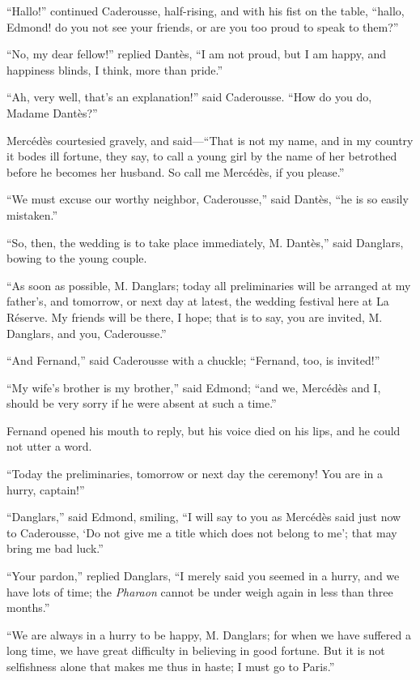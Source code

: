 “Hallo!” continued Caderousse, half-rising, and with his fist on the
table, “hallo, Edmond! do you not see your friends, or are you too
proud to speak to them?”

“No, my dear fellow!” replied Dantès, “I am not proud, but I am happy,
and happiness blinds, I think, more than pride.”

“Ah, very well, that’s an explanation!” said Caderousse. “How do you
do, Madame Dantès?”

Mercédès courtesied gravely, and said—“That is not my name, and in my
country it bodes ill fortune, they say, to call a young girl by the
name of her betrothed before he becomes her husband. So call me
Mercédès, if you please.”

“We must excuse our worthy neighbor, Caderousse,” said Dantès, “he is
so easily mistaken.”

“So, then, the wedding is to take place immediately, M. Dantès,” said
Danglars, bowing to the young couple.

“As soon as possible, M. Danglars; today all preliminaries will be
arranged at my father’s, and tomorrow, or next day at latest, the
wedding festival here at La Réserve. My friends will be there, I hope;
that is to say, you are invited, M. Danglars, and you, Caderousse.”

“And Fernand,” said Caderousse with a chuckle; “Fernand, too, is
invited!”

“My wife’s brother is my brother,” said Edmond; “and we, Mercédès and
I, should be very sorry if he were absent at such a time.”

Fernand opened his mouth to reply, but his voice died on his lips, and
he could not utter a word.

“Today the preliminaries, tomorrow or next day the ceremony! You are in
a hurry, captain!”

“Danglars,” said Edmond, smiling, “I will say to you as Mercédès said
just now to Caderousse, ‘Do not give me a title which does not belong
to me’; that may bring me bad luck.”

“Your pardon,” replied Danglars, “I merely said you seemed in a hurry,
and we have lots of time; the \textit{Pharaon} cannot be under weigh again in
less than three months.”

“We are always in a hurry to be happy, M. Danglars; for when we have
suffered a long time, we have great difficulty in believing in good
fortune. But it is not selfishness alone that makes me thus in haste; I
must go to Paris.”

